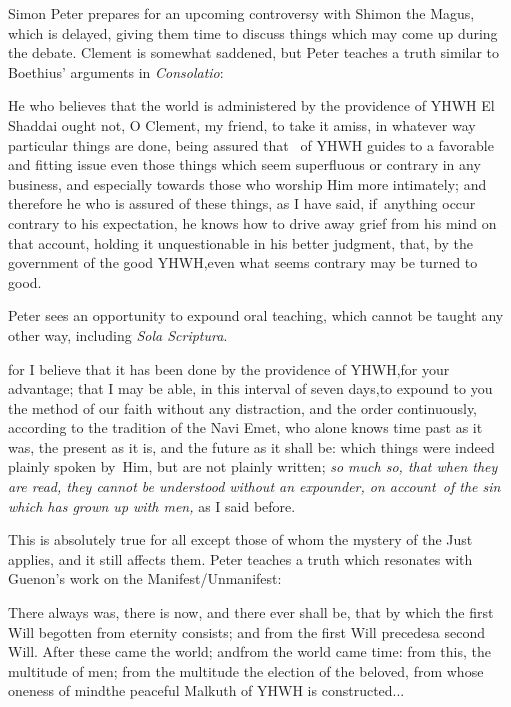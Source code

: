 Simon Peter prepares for an upcoming controversy with Shimon the Magus, which is delayed, giving them time to discuss things which may come up during the debate. Clement is somewhat saddened, but Peter teaches a truth similar to Boethius' arguments in \emph{Consolatio}:

\begin{quotex}
He who believes that the world is administered by the providence of YHWH El Shaddai ought not, O Clement, my friend, to take it amiss, in whatever way particular things are done, being assured that~ of YHWH guides to a favorable and fitting issue even those things which seem superfluous or contrary in any business, and especially towards those who worship Him more intimately; and therefore he who is assured of these things, as I have said, if~anything occur contrary to his expectation, he knows how to drive away grief from his mind on that account, holding it unquestionable in his better judgment, that, by the government of the good YHWH,even what seems contrary may be turned to good.
\end{quotex}


Peter sees an opportunity to expound oral teaching, which cannot be taught any other way, including \emph{Sola Scriptura}.

\begin{quotex}
for I believe that it has been done by the providence of YHWH,for your advantage; that I may be able, in this interval of seven days,to expound to you the method of our faith without any distraction, and the order continuously, according to the tradition of the Navi Emet, who alone knows time past as it was, the present as it is, and the future as it shall be: which things were indeed plainly spoken by~Him, but are not plainly written; \emph{so much so, that when they are read, they cannot be understood without an expounder, on account~of the sin which has grown up with men,} as I said before.
\end{quotex}


This is absolutely true for all except those of whom the mystery of the Just applies, and it still affects them. Peter teaches a truth which resonates with Guenon's work on the Manifest/Unmanifest:

\begin{quotex}
There always was, there is now, and there ever shall be, that by which the first Will begotten from eternity consists; and from the first Will precedesa second Will. After these came the world; andfrom the world came time: from this, the multitude of men; from the multitude the election of the beloved, from whose oneness of mindthe peaceful Malkuth of YHWH is constructed... 
\end{quotex}

